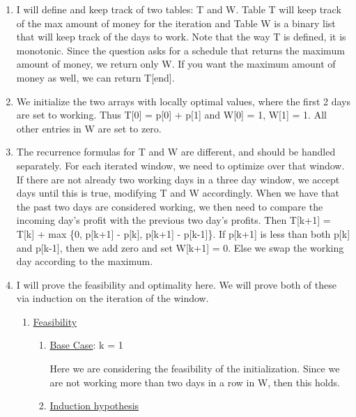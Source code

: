 \begin{solution}     

    \begin{enumerate}
        \item I will define and keep track of two tables: T and W. Table T will keep track of the max amount of money for the iteration and Table W is a binary list that will keep track of the days to work. Note that the way T is defined, it is monotonic. Since the question asks for a schedule that returns the maximum amount of money, we return only W. If you want the maximum amount of money as well, we can return T[end].

        \item We initialize the two arrays with locally optimal values, where the first 2 days are set to working. Thus T[0] = p[0] + p[1] and W[0] = 1, W[1] = 1. All other entries in W are set to zero.

        \item The recurrence formulas for T and W are different, and should be handled separately. For each iterated window, we need to optimize over that window. If there are not already two working days in a three day window, we accept days until this is true, modifying T and W accordingly. When we have that the past two days are considered working, we then need to compare the incoming day's profit with the previous two day's profits. Then T[k+1] = T[k] + max \{0, p[k+1] - p[k], p[k+1] - p[k-1]\}. If p[k+1] is less than both p[k] and p[k-1], then we add zero and set W[k+1] = 0. Else we swap the working day according to the maximum.

        \newpage
        \item I will prove the feasibility and optimality here. We will prove both of these via induction on the iteration of the window. 
        \begin{enumerate}[\bullet]
            \item \underline{Feasibility}
            \begin{enumerate}[-]
                \item \underline{Base Case}: k = 1

                \hop
                Here we are considering the feasibility of the initialization. Since we are not working more than two days in a row in W, then this holds. 

                \item \underline{Induction hypothesis}


\end{enumerate}
\end{enumerate}
\end{enumerate}
\end{solution}
